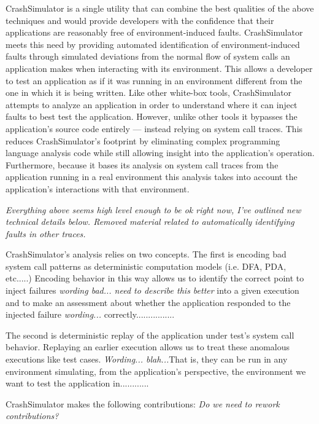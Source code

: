     CrashSimulator is a single utility that can combine the best qualities of the above techniques and would provide
    developers with the confidence that their applications are reasonably free of environment-induced faults.
    CrashSimulator meets this need by providing automated identification of environment-induced faults through simulated
    deviations from the normal flow of system calls an application makes when interacting with its environment. This
    allows a developer to test an application as if it was running in an environment different from the one in which it
    is being written. Like other white-box tools, CrashSimulator attempts to analyze an application in order to
    understand where it can inject faults to best test the application. However, unlike other tools it bypasses the
    application's source code entirely --- instead relying on system call traces. This reduces CrashSimulator's
    footprint by eliminating complex programming language analysis code while still allowing insight into the
    application's operation. Furthermore, because it bases its analysis on system call traces from the application
    running in a real environment this analysis takes into account the application's interactions with that environment.

    \emph{Everything above seems high level enough to be ok right now, I've outlined new technical details
      below. Removed material related to automatically identifying faults in other traces.}
    
    CrashSimulator's analysis relies on two concepts. The first is encoding bad system call patterns as deterministic
    computation models (i.e. DFA, PDA, etc.....) Encoding behavior in this way allows us to identify the correct point
    to inject failures \emph{wording bad... need to describe this better} into a given execution and to make an 
    assessment about whether the application responded to the injected failure \emph{wording...} correctly................

    The second is deterministic replay of the application under test's system call behavior. Replaying an earlier
    execution allows us to treat these anomalous executions like test cases. \emph{Wording... blah...}That is, they can be
    run in any environment simulating, from the application's perspective, the environment we want to test the application
    in............


    CrashSimulator makes the following contributions: \emph{Do we need to rework contributions?}

